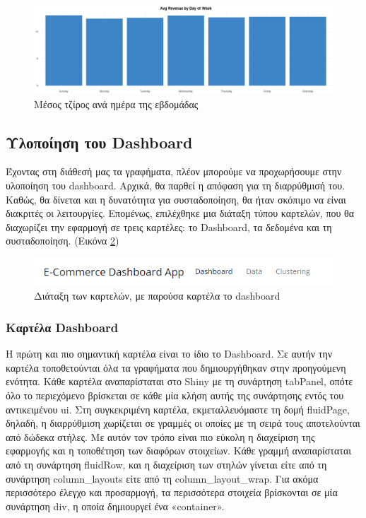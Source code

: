 \documentclass[greek, 12pt]{article}
\begin{document}
\begin{figure}[h]
    \centering
    \includegraphics[width=\textwidth]{pictures/5_timebar_graph.png}
    \caption{Μέσος τζίρος ανά ημέρα της εβδομάδας}
    \label{fig:5}
\end{figure}

\subsection{Υλοποίηση του Dashboard}

Έχοντας στη διάθεσή μας τα γραφήματα, πλέον μπορούμε να προχωρήσουμε στην υλοποίηση του dashboard. Αρχικά, θα παρθεί η απόφαση για τη διαρρύθμισή του. Καθώς, θα δίνεται και η δυνατότητα για συσταδοποίηση, θα ήταν σκόπιμο να είναι διακριτές οι λειτουργίες. Επομένως, επιλέχθηκε μια διάταξη τύπου καρτελών, που θα διαχωρίζει την εφαρμογή σε τρεις καρτέλες: το Dashboard, τα δεδομένα και τη συσταδοποίηση. (Εικόνα \ref{fig:6})

\begin{figure}[h]
    \centering
    \includegraphics[width=\textwidth]{pictures/6_navbar.png}
    \caption{Διάταξη των καρτελών, με παρούσα καρτέλα το dashboard}
    \label{fig:6}
\end{figure}

\subsubsection{Καρτέλα Dashboard}

Η πρώτη και πιο σημαντική καρτέλα είναι το ίδιο το Dashboard. Σε αυτήν την καρτέλα τοποθετούνται όλα τα γραφήματα που δημιουργήθηκαν στην προηγούμενη ενότητα. Κάθε καρτέλα αναπαρίσταται στο Shiny με τη συνάρτηση tabPanel, οπότε όλο το περιεχόμενο βρίσκεται σε κάθε μία κλήση αυτής της συνάρτησης εντός του αντικειμένου ui. Στη συγκεκριμένη καρτέλα, εκμεταλλευόμαστε τη δομή fluidPage, δηλαδή, η διαρρύθμιση χωρίζεται σε γραμμές οι οποίες με τη σειρά τους αποτελούνται από δώδεκα στήλες. Με αυτόν τον τρόπο είναι πιο εύκολη η διαχείριση της εφαρμογής και η τοποθέτηση των διαφόρων στοιχείων. Κάθε γραμμή αναπαρίσταται από τη συνάρτηση fluidRow, και η διαχείριση των στηλών γίνεται είτε από τη συνάρτηση column\_layouts είτε από τη column\_layout\_wrap. Για ακόμα περισσότερο έλεγχο και προσαρμογή, τα περισσότερα στοιχεία βρίσκονται σε μία συνάρτηση div, η οποία δημιουργεί ένα «container».
\end{document}
